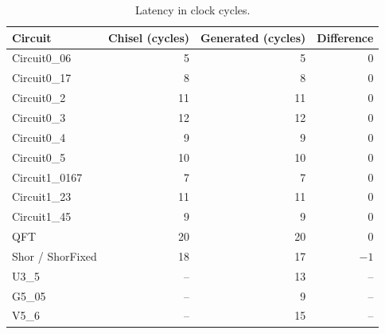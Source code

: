 \begin{table}[ht]
\centering
\caption{Latency in clock cycles.}
\label{tab:cycles}
\begin{tabular}{@{}lrrr@{}}
\toprule
Circuit & Chisel (cycles) & Generated (cycles) & Difference \\
\midrule
Circuit0\_06 & 5 & 5 & 0 \\
Circuit0\_17 & 8 & 8 & 0 \\
Circuit0\_2 & 11 & 11 & 0 \\
Circuit0\_3 & 12 & 12 & 0 \\
Circuit0\_4 & 9 & 9 & 0 \\
Circuit0\_5 & 10 & 10 & 0 \\
Circuit1\_0167 & 7 & 7 & 0 \\
Circuit1\_23 & 11 & 11 & 0 \\
Circuit1\_45 & 9 & 9 & 0 \\
QFT & 20 & 20 & 0 \\
Shor / ShorFixed & 18 & 17 & $-1$ \\
U3\_5 & -- & 13 & -- \\
G5\_05 & -- & 9 & -- \\
V5\_6 & -- & 15 & -- \\
\bottomrule
\end{tabular}
\end{table}
